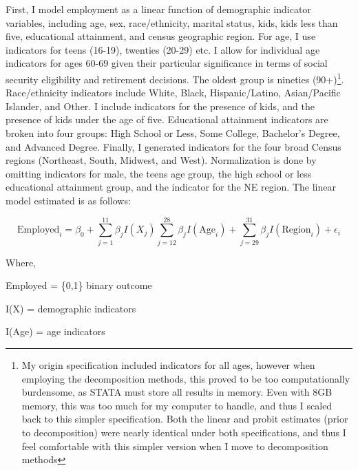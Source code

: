 \documentclass[11pt]{article}
\theoremstyle{definition}
\begin{document}
First, I model employment as a linear function of demographic indicator variables, including age, sex, race/ethnicity, marital status, kids, kids less than five, educational attainment, and census geographic region.  For age, I use indicators for teens (16-19), twenties (20-29) etc.  I allow for individual age indicators for ages 60-69 given their particular significance in terms of social security eligibility and retirement decisions.  The oldest group is nineties (90+)\footnote{My origin specification included indicators for all ages, however when employing the decomposition methods, this proved to be too computationally burdensome, as STATA must store all results in memory.  Even with 8GB memory, this was too much for my computer to handle, and thus I scaled back to this simpler specification.  Both the linear and probit estimates (prior to decomposition) were nearly identical under both specifications, and thus I feel comfortable with this simpler version when I move to decomposition methods}.   Race/ethnicity indicators include White, Black, Hispanic/Latino, Asian/Pacific Islander, and Other.  I include indicators for the presence of kids, and the presence of kids under the age of five.  Educational attainment indicators are broken into four groups: High School or Less, Some College, Bachelor's Degree, and Advanced Degree.  Finally, I generated indicators for the four broad Census regions (Northeast, South, Midwest, and West).  Normalization is done by omitting indicators for male, the teens age group,  the high school or less educational attainment group, and the indicator for the NE region.  The linear model estimated is as follows: 

\begin{equation}
\text{Employed}_{i} = \beta_0 + \sum_{j=1}^{11} \beta_j I(X_{j}) \sum_{j=12}^{28} \beta_{j} I(\text{Age}_{i}) + \sum_{j=29}^{31} \beta_{j} I(\text{Region}_{i}) + \epsilon_{i}
\end{equation}

\par
\noindent
Where, 

\par
\hspace{15mm}Employed = \{0,1\} binary outcome

\par
\hspace{15mm}I(X) = demographic indicators 

\par
\hspace{15mm}I(Age) = age indicators 
\end{document}

